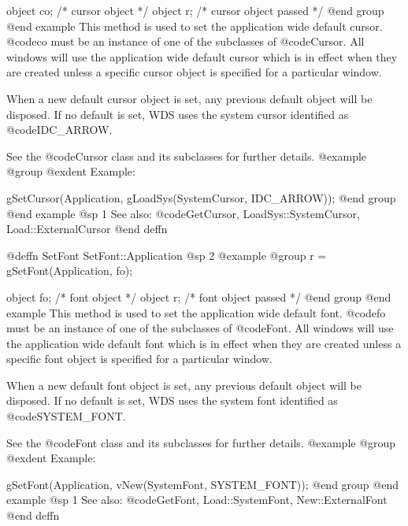 object  co;     /*  cursor object         */
object  r;      /*  cursor object passed  */
@end group
@end example
This method is used to set the application wide default cursor.
@code{co} must be an instance of one of the subclasses of @code{Cursor}.
All windows will use the application wide default cursor which is in
effect when they are created unless a specific cursor object is
specified for a particular window.

When a new default cursor object is set, any previous default object
will be disposed.  If no default is set, WDS uses the system cursor
identified as @code{IDC_ARROW}.

See the @code{Cursor} class and its subclasses for further details.
@example
@group
@exdent Example:

gSetCursor(Application, gLoadSys(SystemCursor, IDC_ARROW));
@end group
@end example
@sp 1
See also:  @code{GetCursor, LoadSys::SystemCursor, Load::ExternalCursor}
@end deffn










@deffn {SetFont} SetFont::Application
@sp 2
@example
@group
r = gSetFont(Application, fo);

object  fo;     /*  font object         */
object  r;      /*  font object passed  */
@end group
@end example
This method is used to set the application wide default font.
@code{fo} must be an instance of one of the subclasses of @code{Font}.
All windows will use the application wide default font which is in
effect when they are created unless a specific font object is
specified for a particular window.

When a new default font object is set, any previous default object
will be disposed.  If no default is set, WDS uses the system font
identified as @code{SYSTEM_FONT}.

See the @code{Font} class and its subclasses for further details.
@example
@group
@exdent Example:

gSetFont(Application, vNew(SystemFont, SYSTEM_FONT));
@end group
@end example
@sp 1
See also:  @code{GetFont, Load::SystemFont, New::ExternalFont}
@end deffn
















